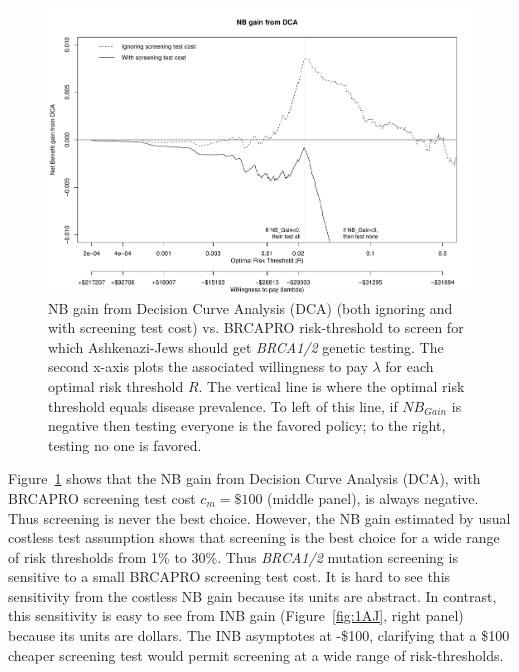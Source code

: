 \documentclass[AMA,STIX1COL]{WileyNJD-v2}
\begin{document}
\begin{figure}[t!]
	\centering
	\includegraphics[angle=-0,width=5.5in,]{testcostsAJ.pdf}
	\caption{NB gain from Decision Curve Analysis (DCA) (both ignoring and with screening test cost) vs. BRCAPRO risk-threshold to screen for which Ashkenazi-Jews should get \textit{BRCA1/2} genetic testing.  The second x-axis plots the associated willingness to pay $\lambda$ for each optimal risk threshold $R$. The vertical line is where the optimal risk threshold equals disease prevalence.  To left of this line, if $N\!B_{Gain}$ is negative then testing everyone is the favored policy; to the right, testing no one is favored.}
	\label{fig:testcostsAJ}
\end{figure}

Figure~\ref{fig:testcostsAJ} shows that the NB gain from Decision Curve Analysis (DCA), with BRCAPRO screening test cost $c_m=\$100$ (middle panel), is always negative.  Thus screening is never the best choice.  However, the NB gain estimated by usual costless test assumption shows that screening is the best choice for a wide range of risk thresholds from 1\% to 30\%.  Thus \textit{BRCA1/2} mutation screening is sensitive to a small BRCAPRO screening test cost.  It is hard to see this sensitivity from the costless NB gain because its units are abstract.  In contrast, this sensitivity is easy to see from INB gain (Figure~\ref{fig:1AJ}, right panel) because its units are dollars.  The INB asymptotes at -\$100, clarifying that a \$100 cheaper screening test would permit screening at a wide range of risk-thresholds.
\end{document}
